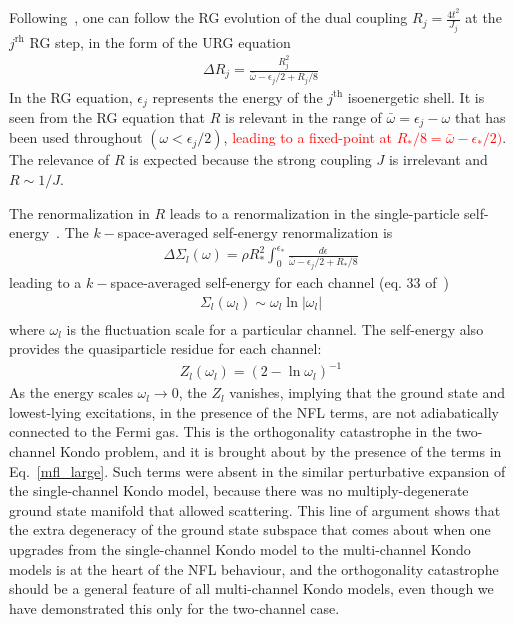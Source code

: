 \documentclass[12pt]{revtex4-2}
\begin{document}
Following~\cite{anirbanmott1}, one can follow the RG evolution of the dual coupling \(R_j = \frac{4t^2}{J_j}\) at the \(j^\text{rh}\) RG step, in the form of the URG equation
\begin{equation}\begin{aligned}
	\Delta R_j = \frac{R_j^2}{\bar\omega - \epsilon_{j}/2 + R_j/8}
\end{aligned}\end{equation}
In the RG equation, \(\epsilon_{j}\) represents the energy of the \(j^\text{th}\) isoenergetic shell. It is seen from the RG equation that \(R\) is relevant in the range of \(\bar\omega = \epsilon_j -\omega\) that has been used throughout \((\omega < \epsilon_j/2)\), \textcolor{red}{leading to a fixed-point at \(R_*/8 = \bar\omega - \epsilon_*/2)\)}. The relevance of \(R\) is expected because the strong coupling \(J\) is irrelevant and \(R \sim 1/J\).

The renormalization in \(R\) leads to a renormalization in the single-particle self-energy~\cite{anirbanmott1}. The \(k-\)space-averaged self-energy renormalization is
\begin{equation}\begin{aligned}
	\Delta \Sigma_l(\omega) = \rho R_*^2\int_0^{\epsilon_*} \frac{d\epsilon}{\bar\omega - \epsilon_j/2 + R_*/8}
\end{aligned}\end{equation}
leading to a \(k-\)space-averaged self-energy for each channel (eq. 33 of~\cite{anirbanmott1})
\begin{equation}\begin{aligned}
	\label{self_energy}
	\Sigma_l(\omega_l) \sim \omega_l \ln |\omega_l|\\
\end{aligned}\end{equation}
where \(\omega_l\) is the fluctuation scale for a particular channel. The self-energy also provides the quasiparticle residue for each channel\cite{anirbanmott1}:
\begin{equation}\begin{aligned}
	Z_l(\omega_l) = \left(2 - \ln \omega_l\right) ^{-1}
\end{aligned}\end{equation}
As the energy scales \(\omega_l \to 0\), the \(Z_l\) vanishes, implying that the ground state and lowest-lying excitations, in the presence of the NFL terms, are not adiabatically connected to the Fermi gas. This is the orthogonality catastrophe in the two-channel Kondo problem, and it is brought about by the presence of the terms in Eq.~\ref{mfl_large}. Such terms were absent in the similar perturbative expansion of the single-channel Kondo model, because there was no multiply-degenerate ground state manifold that allowed scattering. This line of argument shows that the extra degeneracy of the ground state subspace that comes about when one upgrades from the single-channel Kondo model to the multi-channel Kondo models is at the heart of the NFL behaviour, and the orthogonality catastrophe should be a general feature of all multi-channel Kondo models, even though we have demonstrated this only for the two-channel case.
\end{document}
